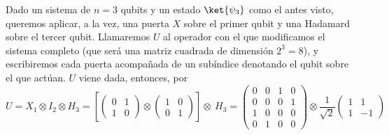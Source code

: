 \documentclass[11pt,a4paper,twoside,pdf]{article}
\numberwithin{equation}{section}
\begin{document}
			Dado un sistema de $n=3$ qubits y un estado $\ket{\psi_3}$ como el antes visto, queremos aplicar, a la vez, una puerta $X$ sobre el primer qubit y una Hadamard sobre el tercer qubit. Llamaremos $U$ al operador con el que modificamos el sistema completo (que será una matriz cuadrada de dimensión $2^3=8$), y escribiremos cada puerta acompañada de un subíndice denotando el qubit sobre el que actúan. $U$ viene dada, entonces, por
				\begin{equation*} \label{eq: Ejemplo Puertas}
					U = X_1 \otimes I_2 \otimes H_3 = \left[\left(\begin{array}{cc}
					0 & 1\\
					1 & 0
					\end{array}\right)\otimes\left(\begin{array}{cc}
					1 & 0\\
					0 & 1
					\end{array}\right)\right]\otimes\ H_3
					=\left(\begin{array}{cccc}
					0 & 0 & 1 & 0\\
					0 & 0 & 0 & 1\\
					1 & 0 & 0 & 0\\
					0 & 1 & 0 & 0
					\end{array}\right)\otimes\frac{1}{\sqrt{2}}\left(\begin{array}{cc}
					1 & 1\\
					1 & -1
					\end{array}\right)
				\end{equation*}
\end{document}
